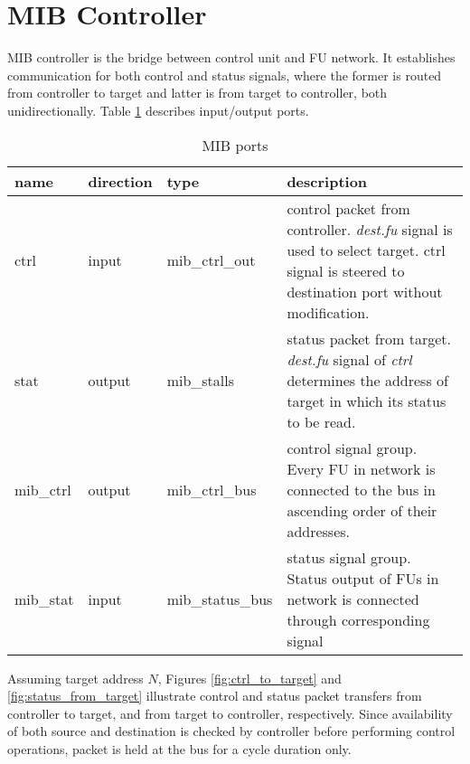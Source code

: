 \section{MIB Controller}
	MIB controller is the bridge between control unit and FU network. It establishes communication for both control and status signals, where the former is routed from controller to target and latter is from target to controller, both unidirectionally. Table \ref{table:mib_description} describes input/output ports.  
	
	
	
	\begin{table}[htbp]
		\begin{tabular}{| l| l | l | p{9cm} |}
			\hline
			\textbf{name} & \textbf{direction} & \textbf{type} &  \textbf{description}\\ \hline
			ctrl & input & mib\_ctrl\_out & control packet from controller. \emph{dest.fu} signal is used to select target. ctrl signal is steered to destination port without modification. \\ \hline
			stat & output & mib\_stalls & status packet from target. \emph{dest.fu} signal of \emph{ctrl} determines the address of target in which its status to be read.  \\ \hline
			mib\_ctrl & output & mib\_ctrl\_bus & control signal group. Every FU in network is connected to the bus in ascending order of their addresses.   \\ \hline
			mib\_stat & input & mib\_status\_bus & status signal group. Status output of FUs in network is connected through corresponding signal   \\ \hline
			
		\end{tabular}
		
		\caption{MIB ports \label{table:mib_description}}
		\centering
	\end{table}
	 
	
	Assuming target address $N$, Figures \ref{fig:ctrl_to_target} and \ref{fig:status_from_target} illustrate control and status packet transfers from controller to target, and from target to controller, respectively. Since availability of both source and destination is checked by controller before performing control operations, packet is held at the bus for a cycle duration only. 
	
